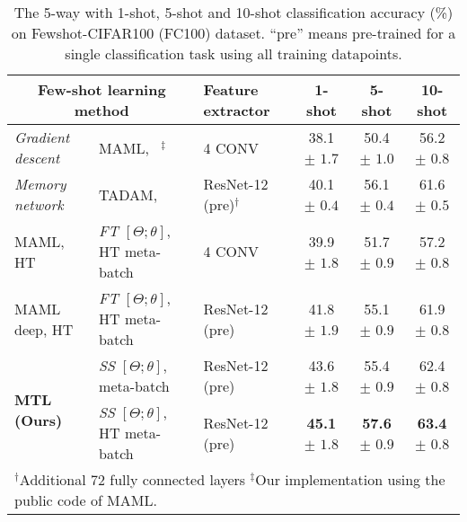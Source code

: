 
\begin{table*}[t]
  \small
  \centering
  \begin{tabular}{l l lccc}
    \toprule
     \multicolumn{2}{c}{Few-shot learning method} & Feature extractor & 1-shot & 5-shot & 10-shot \\
    \midrule    
    \multirow{1}{*}{\emph{Gradient descent}} 
    & MAML, ~\cite{FinnAL17}${}^{\ddag}$ & 4 CONV  &  38.1 $\pm$ $1.7$ & 50.4 $\pm$ $1.0$  & 56.2 $\pm$ $0.8$\\
    \midrule
    \multirow{1}{*}{\emph{Memory network}}
    & TADAM, \cite{OreshkinNIPS18} & ResNet-12 (pre)${}^{\dag}$   & 40.1 $\pm$ $0.4$  & 56.1 $\pm$ $0.4$ &  61.6 $\pm$ $0.5$\\
    \midrule
   MAML, HT  & \emph{FT} $[\Theta; \theta]$, HT meta-batch & 4 CONV & 39.9 $\pm$ $1.8$ & 51.7 $\pm$ $0.9$ &  57.2 $\pm$ $0.8$ \\
    MAML deep, HT  &  \emph{FT} $[\Theta; \theta]$, HT meta-batch & ResNet-12 (pre) & 41.8 $\pm$ $1.9$ & 55.1 $\pm$ $0.9$ & 61.9 $\pm$ $0.8$ \\
     \midrule
    \multirow{2}{*}{\textbf{MTL (Ours)}}
    & \emph{SS} $[\Theta; \theta]$, meta-batch & ResNet-12 (pre) & 43.6 $\pm$ $1.8$ & 55.4 $\pm$ $0.9$ & 62.4 $\pm$ $0.8$ \\
    & \emph{SS} $[\Theta; \theta]$, HT meta-batch & ResNet-12 (pre) & \textbf{45.1} $\mathbf{\pm}$ $\mathbf{1.8}$ &  \textbf{57.6} $\mathbf{\pm}$ $\mathbf{0.9}$ & \textbf{63.4} $\mathbf{\pm}$ $\mathbf{0.8}$ \\
  \bottomrule
  \multicolumn{6}{l}{${}^{\dag}$Additional 72 fully connected layers  { } ${}^{\ddag}$Our implementation using the public code of MAML.}\\
\end{tabular}
  \vspace{0.1cm}
  \caption{The 5-way with 1-shot, 5-shot and 10-shot classification accuracy (\%) on Fewshot-CIFAR100 (FC100) dataset. ``pre'' means pre-trained for a single classification task using all training datapoints.}
    \label{table_fc100}
    \vspace{-0.3cm}
\end{table*}
